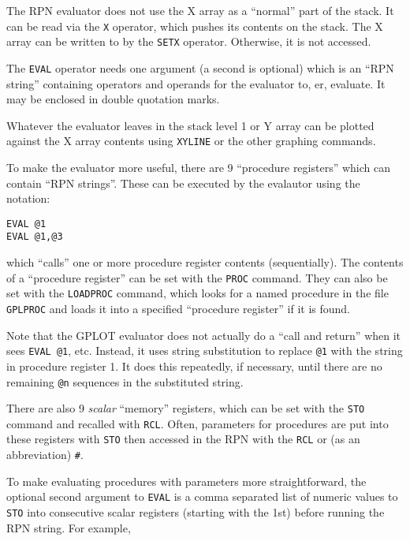 \documentclass[a4paper,twoside,11pt]{article}
\newcommand{\newpara}{\par\vspace{4mm}\noindent}
\begin{document}
\newpara
The RPN evaluator does not use the X array as a ``normal'' part of the
stack. It can be read via the \texttt{X} operator, which pushes its
contents on the stack. The X array can be written to by the
\texttt{SETX} operator. Otherwise, it is not accessed.

\newpara
The \texttt{EVAL} operator needs one argument (a second is optional)
which is an ``RPN string'' containing operators and operands for the
evaluator to, er, evaluate. It may be enclosed in double quotation
marks.

\newpara
Whatever the evaluator leaves in the stack level 1 or Y array can be
plotted against the X array contents using \texttt{XYLINE} or the other
graphing commands.

\newpara
To make the evaluator more useful, there are 9 ``procedure registers''
which can contain ``RPN strings''. These can be executed by the
evalautor using the notation:

\begin{lstlisting}
EVAL @1
EVAL @1,@3
\end{lstlisting}

\newpara
which ``calls'' one or more procedure register contents (sequentially).
The contents of a ``procedure register'' can be set with the
\texttt{PROC} command. They can also be set with the \texttt{LOADPROC}
command, which looks for a named procedure in the file \texttt{GPLPROC}
and loads it into a specified ``procedure register'' if it is found.

\newpara
Note that the GPLOT evaluator does not actually do a ``call and return''
when it sees \texttt{EVAL\ @1}, etc. Instead, it uses string
substitution to replace \texttt{@1} with the string in procedure
register 1. It does this repeatedly, if necessary, until there are no
remaining \texttt{@n} sequences in the substituted string.

\newpara
There are also 9 \emph{scalar} ``memory'' registers, which can be set
with the \texttt{STO} command and recalled with \texttt{RCL}. Often,
parameters for procedures are put into these registers with \texttt{STO}
then accessed in the RPN with the \texttt{RCL} or (as an abbreviation)
\texttt{\#}.

\newpara
To make evaluating procedures with parameters more straightforward, the
optional second argument to \texttt{EVAL} is a comma separated list of
numeric values to \texttt{STO} into consecutive scalar registers
(starting with the 1st) before running the RPN string. For example,
\end{document}
